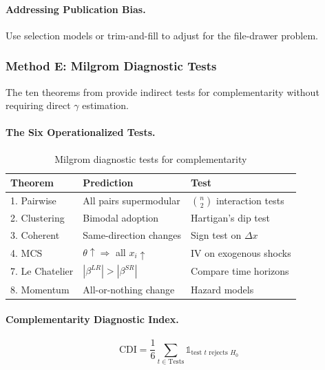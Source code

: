 \paragraph{Addressing Publication Bias.}

Use selection models \citep{hedges1992modeling} or trim-and-fill to adjust for 
the file-drawer problem.

\subsubsection{Method E: Milgrom Diagnostic Tests}

The ten theorems from \citet{brynjolfsson2013complementarity} provide indirect 
tests for complementarity without requiring direct $\gamma$ estimation.

\paragraph{The Six Operationalized Tests.}

\begin{table}[h]
\centering
\small
\begin{tabular}{lll}
\toprule
\textbf{Theorem} & \textbf{Prediction} & \textbf{Test} \\
\midrule
1. Pairwise & All pairs supermodular & $\binom{n}{2}$ interaction tests \\
2. Clustering & Bimodal adoption & Hartigan's dip test \\
3. Coherent & Same-direction changes & Sign test on $\Delta x$ \\
4. MCS & $\theta \uparrow \Rightarrow$ all $x_i \uparrow$ & IV on exogenous shocks \\
7. Le Chatelier & $|\beta^{LR}| > |\beta^{SR}|$ & Compare time horizons \\
8. Momentum & All-or-nothing change & Hazard models \\
\bottomrule
\end{tabular}
\caption{Milgrom diagnostic tests for complementarity}
\label{tab:milgrom-summary}
\end{table}

\paragraph{Complementarity Diagnostic Index.}

\begin{equation}
\text{CDI} = \frac{1}{6} \sum_{t \in \text{Tests}} \mathbb{1}_{\text{test } t \text{ rejects } H_0}
\end{equation}

